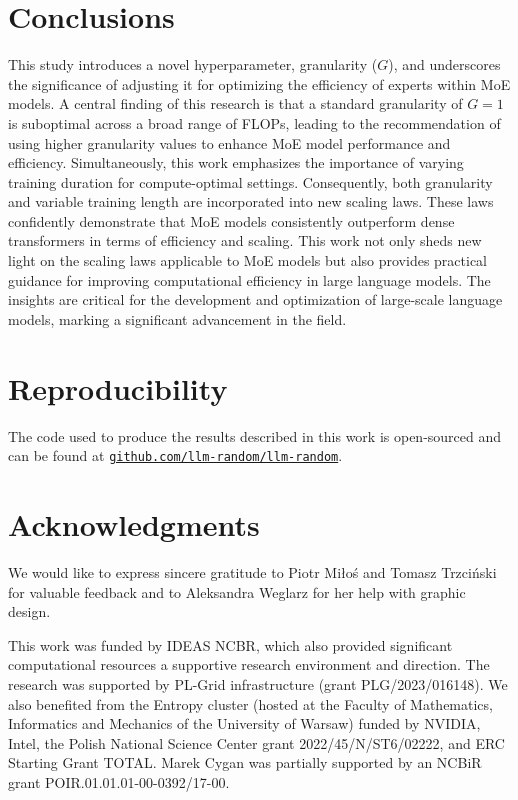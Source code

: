 \section{Conclusions}

This study introduces a novel hyperparameter, granularity ($G$), and underscores the significance of adjusting it for optimizing the efficiency of experts within MoE models.  A central finding of this research is that a standard granularity of $G=1$ is suboptimal across a broad range of FLOPs, leading to the recommendation of using higher granularity values to enhance MoE model performance and efficiency. Simultaneously, this work emphasizes the importance of varying training duration for compute-optimal settings. Consequently, both granularity and variable training length are incorporated into new scaling laws. These laws confidently demonstrate that MoE models consistently outperform dense transformers in terms of efficiency and scaling. This work not only sheds new light on the scaling laws applicable to MoE models but also provides practical guidance for improving computational efficiency in large language models. The insights are critical for the development and optimization of large-scale language models, marking a significant advancement in the field.


\section{Reproducibility}

The code used to produce the results described in this work is open-sourced and can be found at \href{https://github.com/llm-random/llm-random}{\texttt{github.com/llm-random/llm-random}}. 

\newpage
\section*{Acknowledgments}

We would like to express sincere gratitude to Piotr Miło\'s and Tomasz Trzci\'nski for valuable feedback and to Aleksandra Weglarz for her help with graphic design.

This work was funded by IDEAS NCBR, which also provided significant computational resources a supportive research environment and direction. The research was supported by PL-Grid infrastructure (grant PLG/2023/016148). We also benefited from the Entropy cluster (hosted at the Faculty of Mathematics, Informatics and Mechanics of the University of Warsaw) funded by NVIDIA, Intel, the Polish National Science Center grant 2022/45/N/ST6/02222, and ERC Starting Grant TOTAL. Marek Cygan was partially supported by an NCBiR grant POIR.01.01.01-00-0392/17-00.


